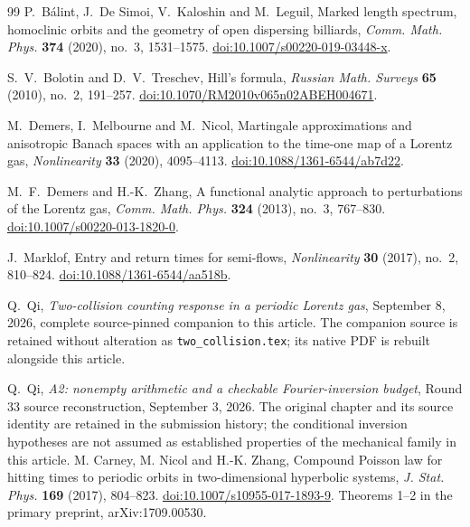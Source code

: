 \begin{thebibliography}{99}
P.~B\'alint, J.~De Simoi, V.~Kaloshin and M.~Leguil,
Marked length spectrum, homoclinic orbits and the geometry of open
dispersing billiards, \emph{Comm. Math. Phys.} \textbf{374} (2020),
no.~3, 1531--1575.
\href{https://doi.org/10.1007/s00220-019-03448-x}{doi:10.1007/s00220-019-03448-x}.

S.~V.~Bolotin and D.~V.~Treschev, Hill's formula,
\emph{Russian Math. Surveys} \textbf{65} (2010), no.~2, 191--257.
\href{https://doi.org/10.1070/RM2010v065n02ABEH004671}{doi:10.1070/RM2010v065n02ABEH004671}.

M.~Demers, I.~Melbourne and M.~Nicol, Martingale approximations and
anisotropic Banach spaces with an application to the time-one map of a
Lorentz gas, \emph{Nonlinearity} \textbf{33} (2020), 4095--4113.
\href{https://doi.org/10.1088/1361-6544/ab7d22}{doi:10.1088/1361-6544/ab7d22}.

M.~F.~Demers and H.-K.~Zhang, A functional analytic approach to
perturbations of the Lorentz gas, \emph{Comm. Math. Phys.}
\textbf{324} (2013), no.~3, 767--830.
\href{https://doi.org/10.1007/s00220-013-1820-0}{doi:10.1007/s00220-013-1820-0}.

J.~Marklof, Entry and return times for semi-flows,
\emph{Nonlinearity} \textbf{30} (2017), no.~2, 810--824.
\href{https://doi.org/10.1088/1361-6544/aa518b}{doi:10.1088/1361-6544/aa518b}.

Q.~Qi, \emph{Two-collision counting response in a periodic Lorentz gas},
September 8, 2026, complete source-pinned companion to this article.
The companion source is retained without alteration as
\texttt{two\_collision.tex}; its native PDF is rebuilt alongside this article.

Q.~Qi, \emph{A2: nonempty arithmetic and a checkable Fourier-inversion
budget}, Round 33 source reconstruction, September 3, 2026.
The original chapter and its source identity are retained in the
submission history; the conditional inversion hypotheses are not assumed
as established properties of the mechanical family in this article.
M. Carney, M. Nicol and H.-K. Zhang,
Compound Poisson law for hitting times to periodic orbits in two-dimensional
hyperbolic systems, \emph{J. Stat. Phys.} \textbf{169} (2017), 804--823.
\href{https://doi.org/10.1007/s10955-017-1893-9}{doi:10.1007/s10955-017-1893-9}.
Theorems 1--2 in the primary preprint, arXiv:1709.00530.


\end{thebibliography}
